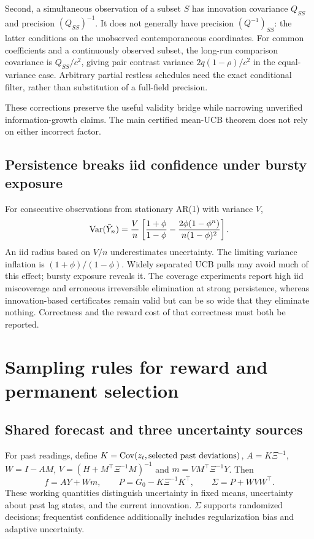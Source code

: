 Second, a simultaneous observation of a subset $S$ has innovation covariance $Q_{SS}$ and precision $(Q_{SS})^{-1}$. It does not generally have precision $(Q^{-1})_{SS}$: the latter conditions on the unobserved contemporaneous coordinates. For common coefficients and a continuously observed subset, the long-run comparison covariance is $Q_{SS}/c^2$, giving pair contrast variance $2q(1-\rho)/c^2$ in the equal-variance case. Arbitrary partial restless schedules need the exact conditional filter, rather than substitution of a full-field precision.

These corrections preserve the useful validity bridge while narrowing unverified information-growth claims. The main certified mean-UCB theorem does not rely on either incorrect factor.

\subsection{Persistence breaks iid confidence under bursty exposure}
For consecutive observations from stationary AR(1) with variance $V$,
\begin{equation}
\operatorname{Var}(\bar Y_n)=\frac Vn\left[\frac{1+\phi}{1-\phi}
-\frac{2\phi(1-\phi^n)}{n(1-\phi)^2}\right].
\end{equation}
An iid radius based on $V/n$ underestimates uncertainty. The limiting variance inflation is $(1+\phi)/(1-\phi)$. Widely separated UCB pulls may avoid much of this effect; bursty exposure reveals it. The coverage experiments report high iid miscoverage and erroneous irreversible elimination at strong persistence, whereas innovation-based certificates remain valid but can be so wide that they eliminate nothing. Correctness and the reward cost of that correctness must both be reported.

\section{Sampling rules for reward and permanent selection}

\subsection{Shared forecast and three uncertainty sources}
For past readings, define $K=\operatorname{Cov}(z_t,\text{selected past deviations})$, $A=K\Xi^{-1}$, $W=I-AM$, $V=(H+M^\top\Xi^{-1}M)^{-1}$ and $m=VM^\top\Xi^{-1}Y$. Then
\begin{equation}
f=AY+Wm,\qquad P=G_0-K\Xi^{-1}K^\top,\qquad \Sigma=P+WVW^\top.
\end{equation}
These working quantities distinguish uncertainty in fixed means, uncertainty about past lag states, and the current innovation. $\Sigma$ supports randomized decisions; frequentist confidence additionally includes regularization bias and adaptive uncertainty.

